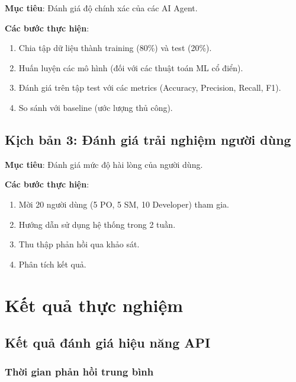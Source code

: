 \documentclass[12pt,a4paper]{report}
\begin{document}
\textbf{Mục tiêu}: Đánh giá độ chính xác của các AI Agent.

\textbf{Các bước thực hiện}:

\begin{enumerate}
\item Chia tập dữ liệu thành training (80\%) và test (20\%).
\item Huấn luyện các mô hình (đối với các thuật toán ML cổ điển).
\item Đánh giá trên tập test với các metrics (Accuracy, Precision, Recall, F1).
\item So sánh với baseline (ước lượng thủ công).
\end{enumerate}

\subsection{Kịch bản 3: Đánh giá trải nghiệm người dùng}

\textbf{Mục tiêu}: Đánh giá mức độ hài lòng của người dùng.

\textbf{Các bước thực hiện}:

\begin{enumerate}
\item Mời 20 người dùng (5 PO, 5 SM, 10 Developer) tham gia.
\item Hướng dẫn sử dụng hệ thống trong 2 tuần.
\item Thu thập phản hồi qua khảo sát.
\item Phân tích kết quả.
\end{enumerate}

\section{Kết quả thực nghiệm}

\subsection{Kết quả đánh giá hiệu năng API}

\subsubsection{Thời gian phản hồi trung bình}
\end{document}
